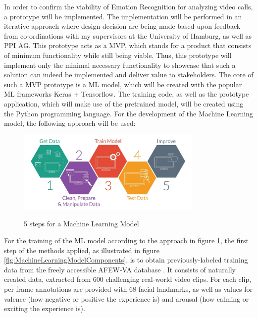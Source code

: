 \documentclass[11pt,a4paper]{scrbook}
\begin{document}
In order to confirm the viability of Emotion Recognition for analyzing video calls, a prototype will be implemented. The implementation will be performed in an iterative approach where design decision are being made based upon feedback from co-ordinations with my supervisors at the University of Hamburg, as well as PPI AG.
\newline\newline
This prototype acts as a \gls{MVP}, which stands for a product that consists of minimum functionality while still being viable. Thus, this prototype will implement only the minimal necessary functionality to showcase that such a solution can indeed be implemented and deliver value to stakeholders.
\newline\newline
The core of such a \gls{MVP} prototype is a \gls{ML} model, which will be created with the popular \gls{ML} frameworks Keras + Tensorflow. The training code, as well as the prototype application, which will make use of the pretrained model, will be created using the Python programming language.
\newline\newline
For the development of the Machine Learning model, the following approach will be used:

\begin{figure}[H]
  \begin{center}
  \includegraphics[width=0.8\textwidth]{Figures/machine_learning.jpg}
  \caption{5 steps for a Machine Learning Model} \citep{Poddar:2016:MachineLearning}
  \label{fig:Poddar:2016:MachineLearning}
  \end{center}
\end{figure}

For the training of the \gls{ML} model according to the approach in figure \ref{fig:Poddar:2016:MachineLearning}, the first step of the methods applied, as illustrated in figure \ref{fig:MachineLearningModelComponents}, is to obtain previously-labeled training data from the freely accessible AFEW-VA database \citep{Kossaifi:2017:AFEW-VADatabase}. It consists of naturally created data, extracted from 600 challenging real-world video clips. For each clip, per-frame annotations are provided with 68 facial landmarks, as well as values for valence (how negative or positive the experience is) and arousal (how calming or exciting the experience is).
\newpage
\end{document}

